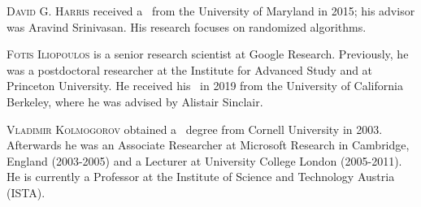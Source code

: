 \documentclass{toc}
\begin{document}
%
%
%
%
%
%
%
%
%
%
%
%
%
%
%
%
%
%
%
%
\begin{tocaboutauthors}
\begin{tocabout}[harris]  %
\textsc{David G. Harris} received a \phd\ from 
the  %
University of Maryland in 2015; 
his advisor was Aravind Srinivasan. His research  focuses on randomized algorithms.
\end{tocabout}
\begin{tocabout}[iliopoulos]
\textsc{Fotis Iliopoulos} is a senior research scientist at Google Research. 
Previously, he was a postdoctoral researcher at the Institute for Advanced Study and
at  %
Princeton University. He received his \phd\
in 2019 %
 from the University of California Berkeley, where he was advised by Alistair Sinclair.    %
\end{tocabout}
\begin{tocabout}[kolmogorov]
\textsc{Vladimir Kolmogorov} obtained a \phd\ degree from Cornell University in 2003.
Afterwards he was an Associate Researcher at Microsoft Research in Cambridge, 
England (2003-2005) and a Lecturer at University College London (2005-2011). 
He is currently a Professor at the Institute of Science and Technology Austria (ISTA).
\end{tocabout}
\end{tocaboutauthors}
\end{document}
